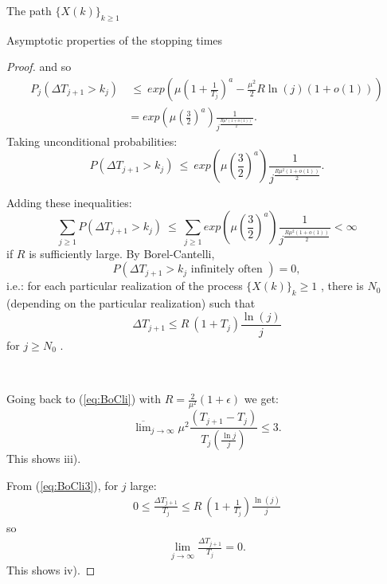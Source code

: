 \documentclass[12pt]{article}
\begin{document}
\begin{section}{The path $\{X(k)\}_{k\ge1}$ }
\begin{subsection}{Asymptotic properties of the stopping times}
\begin{proof}
and so
\begin{align*} 
P_j\left( \Delta T_{j+1} > k_j \right) &~\le~
exp( \mu  (1 + \frac{1}{T_j})^a 
- \frac{\mu^2 }{2} R \ln(j) (1+ o(1))  ) \\
&= exp( \mu  (\frac{3}{2})^a ) 
\frac{1}{ j^{\frac{R\mu^2(1+ o(1)) }{2}} }.
\end{align*} Taking unconditional probabilities:
\begin{equation*} 
P\left( \Delta T_{j+1} > k_j \right) ~\le~
 exp( \mu  (\frac{3}{2})^a ) 
\frac{1}{ j^{\frac{R\mu^2(1+ o(1)) }{2}} }.
\end{equation*}

Adding these inequalities:
\begin{equation} \label{eq:BoCli}
\sum_{j\ge1}  P\left( \Delta T_{j+1} > k_j \right) ~\le~
 \sum_{j\ge1} exp( \mu  (\frac{3}{2})^a ) 
\frac{1}{ j^{\frac{R\mu^2(1+ o(1)) }{2}} } < \infty
\end{equation}
if $R$ is sufficiently large. By Borel-Cantelli, 
\begin{equation} \label{eq:BoCli2}
 P\left( \Delta T_{j+1} > k_j \text{ infinitely often }\right) =0 ,
\end{equation} i.e.: for each particular realization of the process $\{X(k)\}_k\ge1$ , there is $N_0$ (depending on the particular realization) such that 
\begin{equation} \label{eq:BoCli3}
\Delta T_{j+1} \le R \ (1+T_j) \frac{\ln(j)}{j} 
\end{equation} 
for $j\ge N_0$ . 
\

\

Going back to (\ref{eq:BoCli}) with $R =  \frac{2}{\mu^2}(1+\epsilon)$ we get:
$$
\overline{\lim}_{j \rightarrow \infty } \mu^2 
\frac{(T_{j+1}-T_j)}{ T_j (\frac{\ln j}{j})} \le 3.
$$
This shows iii).

From (\ref{eq:BoCli3}), for $j$ large:
\begin{align*}
0 \le \frac{\Delta T_{j+1} }{T_j} \le R \ (1+\frac{1}{T_j}) \frac{\ln(j)}{j}
\end{align*}
so
\begin{align*}
\lim_{j \rightarrow \infty} \frac{\Delta T_{j+1} }{T_j} = 0. 
\end{align*}
This shows iv).


\end{proof}


\end{subsection}





\end{section}
\end{document}
